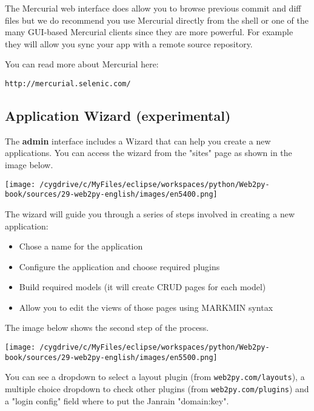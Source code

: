 \documentclass[justified,sixbynine,notoc]{tufte-book}
\def\ft{\small\tt}
\begin{document}
\begin{fullwidth}
The Mercurial web interface does allow you to browse previous commit and diff files but we do recommend you use Mercurial directly from the shell or one of the many GUI-based Mercurial clients since they are more powerful. For example they will allow you sync your app with a remote source repository.

You can read more about Mercurial here:
\begin{lstlisting}[keywords={}]
http://mercurial.selenic.com/
\end{lstlisting}

\goodbreak\subsection{Application Wizard (experimental)}

The {\bf admin} interface includes a Wizard that can help you create a new applications.
You can access the wizard from the "sites" page as shown in the image below.


\goodbreak\begin{center}\texttt{[image: /cygdrive/c/MyFiles/eclipse/workspaces/python/Web2py-book/sources/29-web2py-english/images/en5400.png]}\end{center}


The wizard will guide you through a series of steps involved in creating a new application:

\begin{itemize}
\item Chose a name for the application

\item Configure the application and choose required plugins

\item Build required models (it will create CRUD pages for each model)

\item Allow you to edit the views of those pages using MARKMIN syntax
\end{itemize}

The image below shows the second step of the process.


\goodbreak\begin{center}\texttt{[image: /cygdrive/c/MyFiles/eclipse/workspaces/python/Web2py-book/sources/29-web2py-english/images/en5500.png]}\end{center}


You can see a dropdown to select a layout plugin (from {\ft web2py.com/layouts}), a multiple choice dropdown to check other plugins (from {\ft web2py.com/plugins}) and a "login config" field where to put the Janrain "domain:key".


\end{fullwidth}
\end{document}

